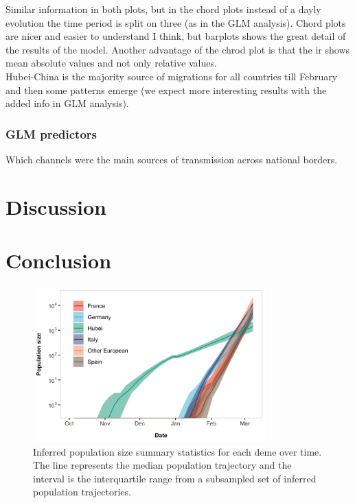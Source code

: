 \documentclass[12pt,]{article}
\begin{document}
Similar information in both plots, but in the chord plots instead of a dayly evolution the time period is split on three (as in the GLM analysis). Chord plots are nicer and easier to understand I think, but barplots shows the great detail of the results of the model. Another advantage of the chrod plot is that the ir shows mean absolute values and not only relative values.\\

Hubei-China is the majority source of migrations for all countries till February and then some patterns emerge (we expect more interesting results with the added info in GLM analysis).\\



\subsubsection*{GLM predictors}
Which channels were the main sources of transmission across national borders.


\section*{Discussion}

\section*{Conclusion}


\begin{figure}[ht]
    \centering
    \includegraphics[width=0.8\textwidth]{201014_europe2_figtraj01.png}
    \caption{Inferred population size summary statistics for each deme over time. The line represents the median population trajectory and the interval is the interquartile range from a subsampled set of inferred population trajectories.}
    \label{fig:gribbon}
\end{figure}
\end{document}

